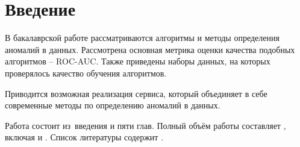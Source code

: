 \chapter*{Введение}                         %

В бакалаврской работе рассматриваются алгоритмы и методы определения аномалий в данных. Рассмотрена основная метрика оценки качества подобных алгоритмов -- ROC-AUC. Также приведены наборы данных, на которых проверялось качество обучения алгоритмов.

Приводится возможная реализация сервиса, который объединяет в себе современные методы по определению аномалий в данных.

Работа состоит из~введения и пяти глав.
Полный объём работы составляет
, включая
 и
.   Список литературы содержит
.
